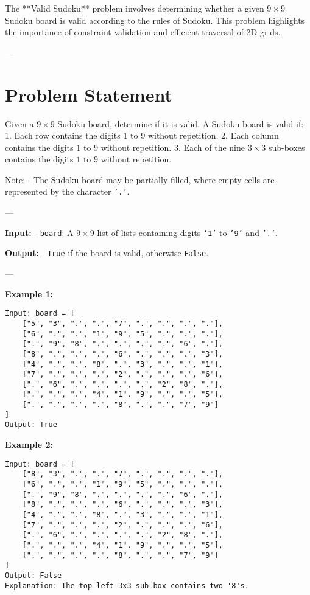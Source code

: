 
\label{problem:Valid_Sudoku}

The **Valid Sudoku** problem involves determining whether a given \(9 \times 9\) Sudoku board is valid according to the rules of Sudoku. This problem highlights the importance of constraint validation and efficient traversal of 2D grids.

---

\section*{Problem Statement}
Given a \(9 \times 9\) Sudoku board, determine if it is valid. A Sudoku board is valid if:
1. Each row contains the digits \(1\) to \(9\) without repetition.
2. Each column contains the digits \(1\) to \(9\) without repetition.
3. Each of the nine \(3 \times 3\) sub-boxes contains the digits \(1\) to \(9\) without repetition.

Note:
- The Sudoku board may be partially filled, where empty cells are represented by the character \texttt{'.'}.

---

\textbf{Input:}
- \texttt{board}: A \(9 \times 9\) list of lists containing digits \texttt{'1'} to \texttt{'9'} and \texttt{'.'}.

\textbf{Output:}
- \texttt{True} if the board is valid, otherwise \texttt{False}.

---

\textbf{Example 1:}
\begin{verbatim}
Input: board = [
    ["5", "3", ".", ".", "7", ".", ".", ".", "."],
    ["6", ".", ".", "1", "9", "5", ".", ".", "."],
    [".", "9", "8", ".", ".", ".", ".", "6", "."],
    ["8", ".", ".", ".", "6", ".", ".", ".", "3"],
    ["4", ".", ".", "8", ".", "3", ".", ".", "1"],
    ["7", ".", ".", ".", "2", ".", ".", ".", "6"],
    [".", "6", ".", ".", ".", ".", "2", "8", "."],
    [".", ".", ".", "4", "1", "9", ".", ".", "5"],
    [".", ".", ".", ".", "8", ".", ".", "7", "9"]
]
Output: True
\end{verbatim}

\textbf{Example 2:}
\begin{verbatim}
Input: board = [
    ["8", "3", ".", ".", "7", ".", ".", ".", "."],
    ["6", ".", ".", "1", "9", "5", ".", ".", "."],
    [".", "9", "8", ".", ".", ".", ".", "6", "."],
    ["8", ".", ".", ".", "6", ".", ".", ".", "3"],
    ["4", ".", ".", "8", ".", "3", ".", ".", "1"],
    ["7", ".", ".", ".", "2", ".", ".", ".", "6"],
    [".", "6", ".", ".", ".", ".", "2", "8", "."],
    [".", ".", ".", "4", "1", "9", ".", ".", "5"],
    [".", ".", ".", ".", "8", ".", ".", "7", "9"]
]
Output: False
Explanation: The top-left 3x3 sub-box contains two '8's.
\end{verbatim}

